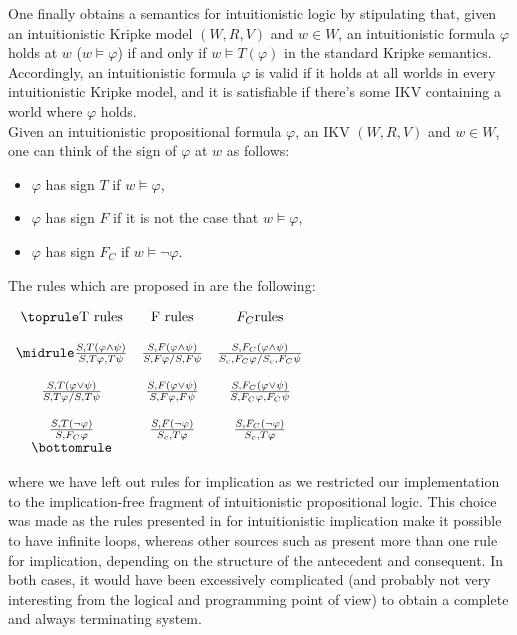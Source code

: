 One finally obtains a semantics for intuitionistic logic by stipulating that, given an intuitionistic Kripke model $(W,R,V)$ and $w \in W$, an intuitionistic formula $\varphi$ holds at $w$ ($w \vDash \varphi$) if and only if $w \vDash T(\varphi)$ in the standard Kripke semantics.
Accordingly, an intuitionistic formula $\varphi$ is valid if it holds at all worlds in every intuitionistic Kripke model, and it is satisfiable if there's some IKV containing a world where $\varphi$ holds. \\
Given an intuitionistic propositional formula $\varphi$, an IKV $(W,R,V)$ and $w \in W$, one can think of the sign of $\varphi$ at $w$ as follows:
\begin{itemize}
    \item $\varphi$ has sign $T$ if $w \vDash \varphi$,
    \item $\varphi$ has sign $F$ if it is not the case that $w \vDash \varphi$,
    \item $\varphi$ has sign $F_C$ if $w \vDash \neg \varphi$.
\end{itemize}

The rules which are proposed in \cite{main} are the following:

\begin{table}[h]
\Large
\centering
$\begin{array}{ ccc }
\toprule
\text{T rules} & \text{F rules} & F_C \text{rules} \\
& & \\
\midrule
\frac{S, T(\varphi \wedge \psi)}{S,T\varphi,T\psi}& \frac{S, F(\varphi \wedge \psi)}{S,F\varphi/S,F\psi} & \frac{S,F_C(\varphi \wedge \psi)}{S_c,F_C\varphi/S_c,F_C\psi}\\ 
& & \\
\frac{S, T(\varphi \vee \psi)}{S,T\varphi/S,T\psi} & \frac{S, F(\varphi \vee \psi)}{S,F\varphi,F\psi} & \frac{S,F_C(\varphi \vee \psi)}{S,F_C\varphi,F_C\psi}\\
& & \\
\frac{S, T(\neg \varphi)}{S,F_C\varphi} & \frac{S, F(\neg \varphi)}{S_c,T\varphi} & \frac{S, F_C(\neg \varphi)}{S_c,T\varphi}\\
\bottomrule
\end{array}$
\end{table}

where we have left out rules for implication as we restricted our implementation to the implication-free fragment of intuitionistic propositional logic. This choice was made as the rules presented in \cite{main} for intuitionistic implication make it possible to have infinite loops, whereas other sources such as \cite{imp} present more than one rule for implication, depending on the structure of the antecedent and consequent. In both cases, it would have been excessively complicated (and probably not very interesting from the logical and programming point of view) to obtain a complete and always terminating system.

